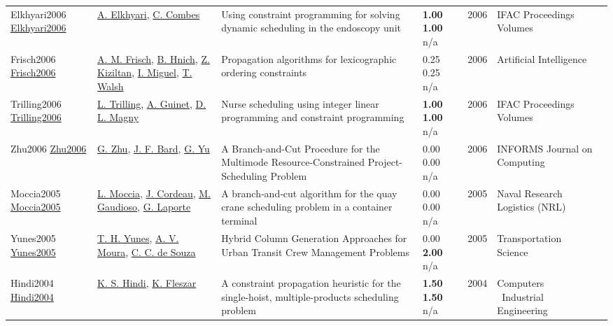 {\begin{longtable}{p{3cm}p{5cm}p{10cm}p{1cm}rp{2.5cm}l}
Elkhyari2006 \href{http://dx.doi.org/10.3182/20060517-3-fr-2903.00358}{Elkhyari2006} & \hyperref[auth:a292]{A. Elkhyari}, \hyperref[auth:a2069]{C. Combes} & Using constraint programming for solving dynamic scheduling in the endoscopy unit & \noindent{}\textbf{1.00} \textbf{1.00} n/a & 2006 & IFAC Proceedings Volumes & \cite{Elkhyari2006}\\
Frisch2006 \href{http://dx.doi.org/10.1016/j.artint.2006.03.002}{Frisch2006} & \hyperref[auth:a1666]{A. M. Frisch}, \hyperref[auth:a137]{B. Hnich}, \hyperref[auth:a97]{Z. Kiziltan}, \hyperref[auth:a1667]{I. Miguel}, \hyperref[auth:a276]{T. Walsh} & \cellcolor{gold!20}Propagation algorithms for lexicographic ordering constraints & \noindent{}0.25 0.25 n/a & 2006 & Artificial Intelligence & \cite{Frisch2006}\\
Trilling2006 \href{http://dx.doi.org/10.3182/20060517-3-fr-2903.00340}{Trilling2006} & \hyperref[auth:a1656]{L. Trilling}, \hyperref[auth:a1657]{A. Guinet}, \hyperref[auth:a1658]{D. L. Magny} & Nurse scheduling using integer linear programming and constraint programming & \noindent{}\textbf{1.00} \textbf{1.00} n/a & 2006 & IFAC Proceedings Volumes & \cite{Trilling2006}\\
Zhu2006 \href{http://dx.doi.org/10.1287/ijoc.1040.0121}{Zhu2006} & \hyperref[auth:a1528]{G. Zhu}, \hyperref[auth:a1529]{J. F. Bard}, \hyperref[auth:a1530]{G. Yu} & A Branch-and-Cut Procedure for the Multimode Resource-Constrained Project-Scheduling Problem & \noindent{}\textcolor{black!50}{0.00} \textcolor{black!50}{0.00} n/a & 2006 & \cellcolor{red!20}INFORMS Journal on Computing & \cite{Zhu2006}\\
Moccia2005 \href{http://dx.doi.org/10.1002/nav.20121}{Moccia2005} & \hyperref[auth:a1589]{L. Moccia}, \hyperref[auth:a1590]{J. Cordeau}, \hyperref[auth:a1591]{M. Gaudioso}, \hyperref[auth:a1074]{G. Laporte} & A branch‐and‐cut algorithm for the quay crane scheduling problem in a container terminal & \noindent{}\textcolor{black!50}{0.00} \textcolor{black!50}{0.00} n/a & 2005 & Naval Research Logistics (NRL) & \cite{Moccia2005}\\
Yunes2005 \href{http://dx.doi.org/10.1287/trsc.1030.0078}{Yunes2005} & \hyperref[auth:a942]{T. H. Yunes}, \hyperref[auth:a1580]{A. V. Moura}, \hyperref[auth:a170]{C. C. de Souza} & Hybrid Column Generation Approaches for Urban Transit Crew Management Problems & \noindent{}\textcolor{black!50}{0.00} \textbf{2.00} n/a & 2005 & \cellcolor{red!20}Transportation Science & \cite{Yunes2005}\\
Hindi2004 \href{http://dx.doi.org/10.1016/j.cie.2004.03.002}{Hindi2004} & \hyperref[auth:a1826]{K. S. Hindi}, \hyperref[auth:a1827]{K. Fleszar} & A constraint propagation heuristic for the single-hoist, multiple-products scheduling problem & \noindent{}\textbf{1.50} \textbf{1.50} n/a & 2004 & Computers \  Industrial Engineering & \cite{Hindi2004}\\

\end{longtable}}
